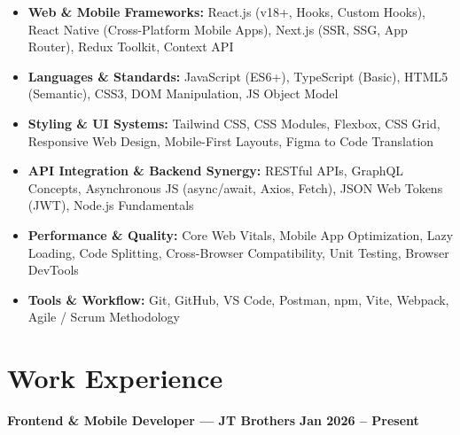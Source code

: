\documentclass[a4paper,10pt]{article}
\begin{document}
\begin{itemize}

    \item \textbf{Web \& Mobile Frameworks:}
    React.js (v18+, Hooks, Custom Hooks), React Native (Cross-Platform Mobile Apps),
    Next.js (SSR, SSG, App Router), Redux Toolkit, Context API

    \item \textbf{Languages \& Standards:}
    JavaScript (ES6+), TypeScript (Basic), HTML5 (Semantic), CSS3,
    DOM Manipulation, JS Object Model

    \item \textbf{Styling \& UI Systems:}
    Tailwind CSS, CSS Modules, Flexbox, CSS Grid, Responsive Web Design,
    Mobile-First Layouts, Figma to Code Translation

    \item \textbf{API Integration \& Backend Synergy:}
    RESTful APIs, GraphQL Concepts, Asynchronous JS (async/await, Axios, Fetch),
    JSON Web Tokens (JWT), Node.js Fundamentals

    \item \textbf{Performance \& Quality:}
    Core Web Vitals, Mobile App Optimization, Lazy Loading, Code Splitting,
    Cross-Browser Compatibility, Unit Testing, Browser DevTools

    \item \textbf{Tools \& Workflow:}
    Git, GitHub, VS Code, Postman, npm, Vite, Webpack, Agile / Scrum Methodology

\end{itemize}

\section*{Work Experience}

\textbf{Frontend \& Mobile Developer --- JT Brothers}
\hfill
\textbf{Jan 2026 -- Present}
\end{document}

